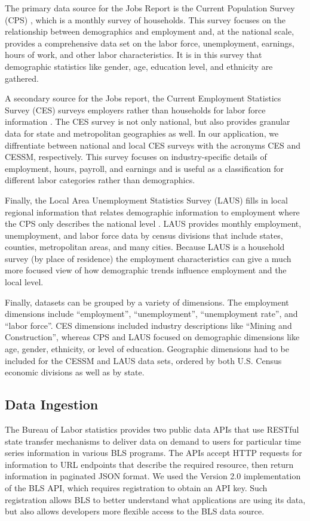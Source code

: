 \documentclass[11pt,letterpaper]{article}
\begin{document}
The primary data source for the Jobs Report is the Current Population Survey (CPS) \cite{_labor_????}, which is a monthly survey of households. This survey focuses on the relationship between demographics and employment and, at the national scale, provides a comprehensive data set on the labor force, unemployment, earnings, hours of work, and other labor characteristics. It is in this survey that demographic statistics like gender, age, education level, and ethnicity are gathered.

A secondary source for the Jobs report, the Current Employment Statistics Survey (CES) surveys employers rather than households for labor force information \cite{_current_2015}. The CES survey is not only national, but also provides granular data for state and metropolitan geographies as well. In our application, we diffrentiate between national and local CES surveys with the acronyms CES and CESSM, respectively. This survey focuses on industry-specific details of employment, hours, payroll, and earnings and is useful as a classification for different labor categories rather than demographics.

Finally, the Local Area Unemployment Statistics Survey (LAUS) fills in local regional information that relates demographic information to employment where the CPS only describes the national level \cite{_local_2015}. LAUS provides monthly employment, unemployment, and labor force data by census divisions that include states, counties, metropolitan areas, and many cities. Because LAUS is a household survey (by place of residence) the employment characteristics can give a much more focused view of how demographic trends influence employment and the local level.

Finally, datasets can be grouped by a variety of dimensions. The employment dimensions include ``employment'', ``unemployment'', ``unemployment rate'', and ``labor force''. CES dimensions included industry descriptions like ``Mining and Construction'', whereas CPS and LAUS focused on demographic dimensions like age, gender, ethnicity, or level of education. Geographic dimensions had to be included for the CESSM and LAUS data sets, ordered by both U.S. Census economic divisions as well as by state.

\subsection{Data Ingestion}

The Bureau of Labor statistics provides two public data APIs that use RESTful state transfer mechanisms to deliver data on demand to users for particular time series information in various BLS programs. The APIs accept HTTP requests for information to URL endpoints that describe the required resource, then return information in paginated JSON format. We used the Version 2.0 implementation of the BLS API, which requires registration to obtain an API key. Such registration allows BLS to better understand what applications are using its data, but also allows developers more flexible access to the BLS data source.
\end{document}

